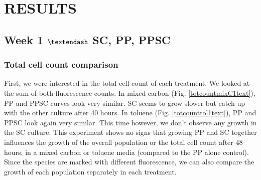 \documentclass[a4paper, 10pt, conference]{ieeeconf}   %
\begin{document}
\section{RESULTS}
\subsection{Week 1 $\textendash$ SC, PP, PPSC}
\subsubsection{Total cell count comparison}


First, we were interested in the total cell count of each treatment. We looked at the sum of both fluorescence counts.
In mixed carbon (Fig. \ref{totcountmixC1text}), PP and PPSC curves look very similar. SC seems to grow slower but catch up with the other culture after 40 hours.
In toluene (Fig. \ref{totcounttol1text}), PP and PPSC look again very similar. This time however, 
we don’t observe any growth in the SC culture.
This experiment shows no signs that growing PP and SC together influences the growth of the overall population or the total cell count after 48 hours, in a mixed carbon or toluene media (compared to the PP alone control).
Since the species are marked with different fluorescence, we can also compare the growth of each population separately in each treatment.\newline

%	
%	
%	
\end{document}

